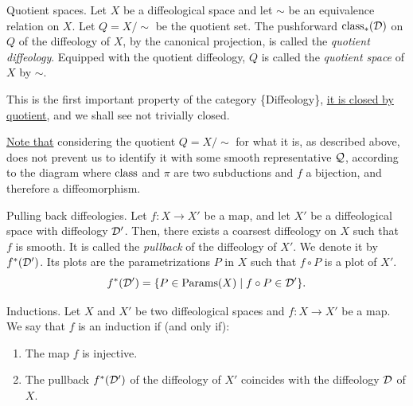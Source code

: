 \begin{Article}{Quotient spaces.}
  Let $X$ be a diffeological space and let $\sim$ be an equivalence relation on $X$.
  Let $Q = X/\!\!\sim$ be the quotient set.
  The pushforward $\operatorname{class}_*(\mathcal{D})$ on  $Q$ of the diffeology of $X$,
  by the canonical projection,
  is called the \emph{quotient diffeology}.
  Equipped with the quotient diffeology,
  $Q$ is called the \emph{quotient space} of $X$ by $\sim$.
  
  This is the first important property of the category \{Diffeology\},
  \uline{it is closed by quotient},
  and we shall see not trivially closed.
  
  \uline{Note that} considering the quotient $Q = X/\!\!\sim$ for what it is,
  as described above,
  does not prevent us to identify it with some smooth representative $\mathcal{Q}$,
  according to the diagram where $\operatorname{class}$ and $\pi$ are two subductions and $f$ a bijection,
  and therefore a diffeomorphism.
  \begin{center}
  \end{center}
\end{Article}
%
\begin{Article}{Pulling back diffeologies.}
  Let $f \colon X \to X'$ be a map,
  and let $X'$ be a diffeological space with diffeology $\mathcal{D}'$.
  Then,
  there exists a coarsest diffeology on $X$ such that $f$ is smooth.
  It is called the \emph{pullback} of the diffeology of $X'$.
  We denote it by $f^*(\mathcal{D}')$.
  Its plots are the parametrizations $P$ in $X$ such that $f \circ P$ is a plot of $X'$.
  $$%
    f^*(\cD') = \{ P \in \Params(X) \mid f \circ P \in \cD' \}.
    $$%
\end{Article}

\begin{Article}{Inductions.}
  Let $X$ and $X'$ be two diffeological spaces and $f \colon X \to X'$ be a map.
  We say that $f$ is an induction if (and only if):
  \begin{enumerate}
    \item The map $f$ is injective.
    \item The pullback $f^*(\mathcal{D}')$ of the diffeology of $X'$ coincides with the diffeology $\mathcal{D}$ of $X$.
  \end{enumerate}
\end{Article}

